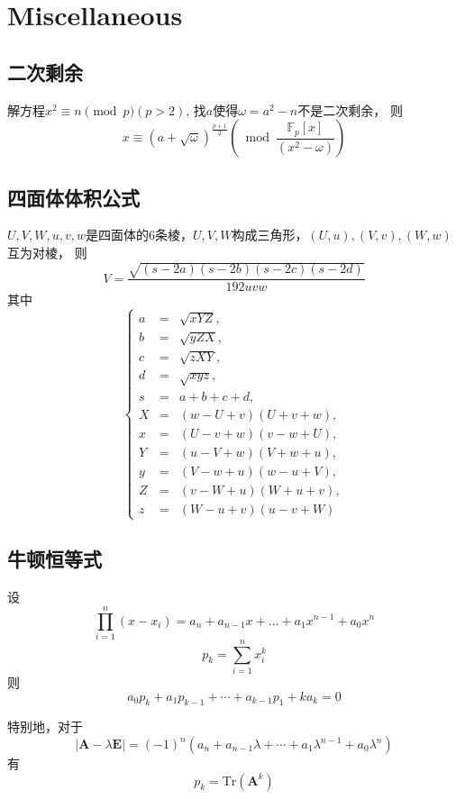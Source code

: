 \documentclass[a4paper]{article}
\begin{document}
\section{Miscellaneous}

\subsection{二次剩余}

解方程$x^2 \equiv n \pmod p (p > 2)$, 
找$a$使得$\omega = a^2 - n$不是二次剩余，
则$$x \equiv (a + \sqrt{\omega})^{\frac{p + 1}{2}} \left(\bmod \frac{\mathbb{F}_p[x]}{(x^2 - \omega)}\right)$$

\subsection{四面体体积公式}

$U, V, W, u, v, w$是四面体的$6$条棱，$U, V, W$构成三角形，$(U, u), (V, v), (W, w)$互为对棱，
则$$V = \frac{\sqrt{(s - 2a)(s - 2b)(s - 2c)(s - 2d)}}{192 uvw}$$
其中$$\left\{\begin{array}{lll}
        a & = & \sqrt{xYZ}, \\
        b & = & \sqrt{yZX}, \\
        c & = & \sqrt{zXY}, \\
        d & = & \sqrt{xyz}, \\
        s & = & a + b + c + d, \\ 
        X & = & (w - U + v)(U + v + w), \\
        x & = & (U - v + w)(v - w + U), \\
        Y & = & (u - V + w)(V + w + u), \\
        y & = & (V - w + u)(w - u + V), \\
        Z & = & (v - W + u)(W + u + v), \\
        z & = & (W - u + v)(u - v + W)
    \end{array}\right.$$

\subsection{牛顿恒等式}

设$$\prod_{i = 1}^n{(x - x_i)} = a_n + a_{n - 1} x + \dots + a_1 x^{n - 1} + a_0 x^n$$
$$p_k = \sum_{i = 1}^n{x_i^k}$$
则$$a_0 p_k + a_1 p_{k - 1} + \cdots + a_{k - 1} p_1 + k a_k = 0$$

特别地，对于$$|\mathbf{A} - \lambda \mathbf{E}| = (-1)^n(a_n + a_{n - 1} \lambda + \cdots + a_1 \lambda^{n - 1} + a_0 \lambda^n)$$
有$$p_k = \mathrm{Tr}(\mathbf{A}^k)$$
\end{document}
